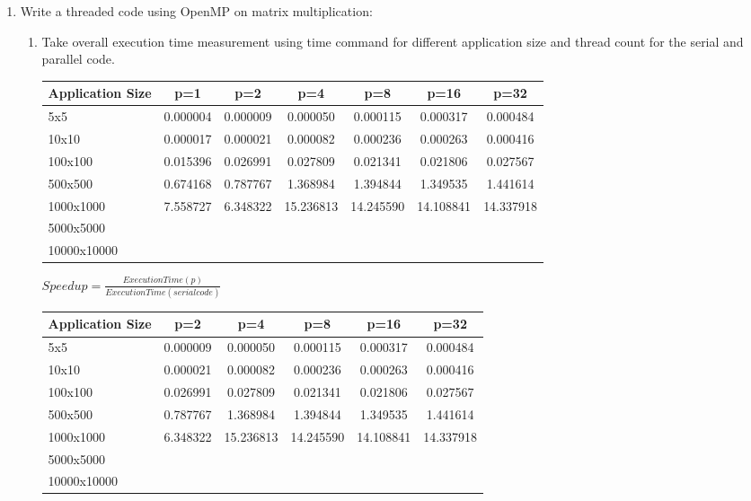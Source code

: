 \documentclass{sem5}
\begin{document}
\begin{enumerate}
\item Write a threaded code using OpenMP on matrix multiplication:
\begin{enumerate}
\item Take overall execution time measurement using time command for different application size and thread count for the serial and parallel code.
\begin{center}
\begin{tabular}{|l|c|c|c|c|c|c|}
\hline
Application Size & p=1 & p=2 & p=4 & p=8 & p=16 & p=32\\
\hline
5x5 & 0.000004&0.000009&0.000050&0.000115&0.000317&0.000484\\
\hline
10x10 &0.000017 &0.000021&0.000082&0.000236&0.000263&0.000416\\
\hline
100x100 & 0.015396&0.026991&0.027809&0.021341&0.021806&0.027567\\
\hline
500x500 &  0.674168&0.787767&1.368984&1.394844&1.349535&1.441614\\
\hline
1000x1000 &7.558727 &6.348322&15.236813&14.245590&14.108841&14.337918\\
\hline
5000x5000 & &&&&&\\
\hline
10000x10000 & &&&&&\\
\hline
\end{tabular}
\end{center}

\begin{center}
$Speedup = \frac{Execution Time(p)}{Execution Time(serial code)}$
\end{center}

\begin{center}
\begin{tabular}{|l|c|c|c|c|c|}
\hline
Application Size & p=2 & p=4 & p=8 & p=16 & p=32\\
\hline
5x5 &0.000009&0.000050&0.000115&0.000317&0.000484\\
\hline
10x10 &0.000021&0.000082&0.000236&0.000263&0.000416\\
\hline
100x100& 0.026991&0.027809&0.021341&0.021806&0.027567\\
\hline
500x500 &0.787767&1.368984&1.394844&1.349535&1.441614\\
\hline
1000x1000  &6.348322&15.236813&14.245590&14.108841&14.337918\\
\hline
5000x5000  &&&&&\\
\hline
10000x10000  &&&&&\\
\hline
\end{tabular}


\end{center}
\end{enumerate}
\end{enumerate}
\end{document}
